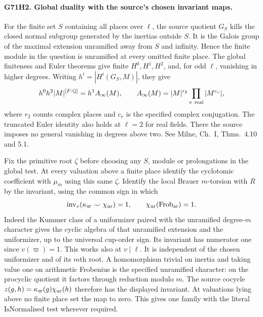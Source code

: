 \paragraph{G71H2. Global duality with the source's chosen invariant maps.}
For the finite set $S$ containing all places over $\ell$, the
source quotient $G_S$ kills the closed normal subgroup generated
by the inertias outside $S$. It is the Galois group of the maximal
extension unramified away from $S$ and infinity. Hence the finite
module in the question is unramified at every omitted finite
place. The global finiteness and Euler theorems give finite
$H^0,H^1,H^2$, and, for odd $\ell$, vanishing in higher degrees.
Writing $h^i=|H^i(G_S,M)|$, they give
\[
  h^0 h^2 |M|^{[F:\mathbb Q]}=h^1 A_\infty(M),\qquad
  A_\infty(M)=|M|^{r_2}\prod_{v\ {\rm real}}|M^{c_v}|,
\]
where $r_2$ counts complex places and $c_v$ is the specified
complex conjugation. The truncated Euler identity also holds at
$\ell=2$ for real fields. There the source imposes no general
vanishing in degrees above two. See Milne, Ch.~I,
Thms.~4.10 and 5.1.

Fix the primitive root $\zeta$ before choosing any $S$, module or
prolongations in the global test. At every valuation above a
finite place identify the cyclotomic coefficient with $\mu_m$
using this same $\zeta$. Identify the local Brauer $m$-torsion
with $R$ by the invariant, using the common sign in which
\[
  \operatorname{inv}_v(\kappa_\varpi\smile\chi_{\rm ur})=1,
  \qquad \chi_{\rm ur}(\operatorname{Frob}_{\rm ar})=1 .
\]
Indeed the Kummer class of a uniformizer paired with the
unramified degree-$m$ character gives the cyclic algebra of that
unramified extension and the uniformizer, up to the universal
cup-order sign. Its invariant has numerator one since
$v(\varpi)=1$. This works also at $v\mid\ell$. It is independent
of the chosen uniformizer and of its $m$th root. A homomorphism
trivial on inertia and taking value one on arithmetic Frobenius
is the specified unramified character: on the procyclic quotient
it factors through reduction modulo $m$. The source cocycle
$z(g,h)=\kappa_\varpi(g)\chi_{\rm ur}(h)$ therefore has the
displayed invariant. At valuations lying above no finite place
set the map to zero. This gives one family with the literal
$\mathrm{IsNormalised}$ test wherever required.

